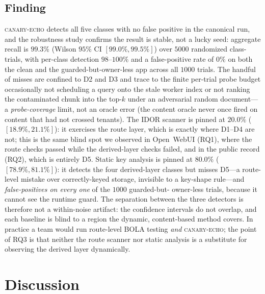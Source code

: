 \IfFileExists{IEEEtran.cls}{\documentclass[conference]{IEEEtran}}{\documentclass[10pt,twocolumn]{article}}
\newcommand{\tool}{\mbox{\textsc{canary-echo}}}
\begin{document}
\subsection{Finding}
\tool{} detects all five classes with no false positive in the canonical run, and the robustness
study confirms the result is stable, not a lucky seed: aggregate recall is $99.3\%$ (Wilson $95\%$ CI
$[99.0\%,99.5\%]$) over $5000$ randomized class-trials, with per-class detection $98$--$100\%$ and a
false-positive rate of $0\%$ on both the clean and the guarded-but-owner-less app across all $1000$
trials. The handful of misses are confined to D2 and D3 and trace to the finite per-trial probe
budget occasionally not scheduling a query onto the stale worker index or not ranking the
contaminated chunk into the top-$k$ under an adversarial random document---a \emph{probe-coverage}
limit, not an oracle error (the content oracle never once fired on content that had not crossed
tenants). The IDOR scanner is pinned at $20.0\%$ ($[18.9\%,21.1\%]$): it exercises the route layer,
which is exactly where D1--D4 are not; this is the same blind spot we observed in Open~WebUI (RQ1),
where the route checks passed while the derived-layer checks failed, and in the public record (RQ2),
which is entirely D5. Static key analysis is pinned at $80.0\%$ ($[78.9\%,81.1\%]$): it detects the
four derived-layer classes but misses D5---a route-level mistake over correctly-keyed storage,
invisible to a key-shape rule---and \emph{false-positives on every one} of the $1000$ guarded-but-%
owner-less trials, because it cannot see the runtime guard. The separation between the three detectors
is therefore not a within-noise artifact: the confidence intervals do not overlap, and each baseline
is blind to a region the dynamic, content-based method covers. In practice a team would run
route-level BOLA testing \emph{and} \tool{}; the point of RQ3 is that neither the route scanner nor
static analysis is a substitute for observing the derived layer dynamically.

\section{Discussion}
\end{document}
